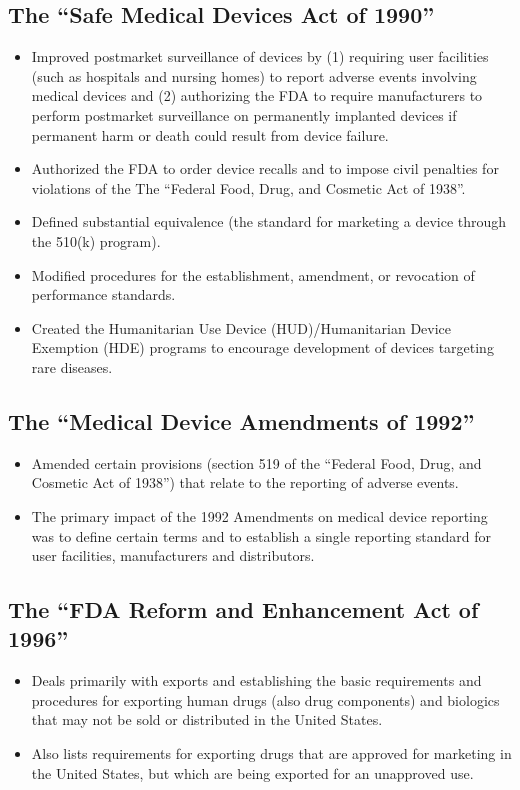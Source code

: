 \documentclass[11pt]{book}
\begin{document}
\subsection{The ``Safe Medical Devices Act of 1990''}
\begin{itemize}
	\item Improved postmarket surveillance of devices by (1) requiring user facilities (such as hospitals and nursing homes) to report adverse events involving medical devices and (2) authorizing the FDA to require manufacturers to perform postmarket surveillance on permanently implanted devices if permanent harm or death could result from device failure.
	\item Authorized the FDA to order device recalls and to impose civil penalties for violations of the The ``Federal Food, Drug, and Cosmetic Act of 1938''.
	\item Defined substantial equivalence (the standard for marketing a device through the 510(k) program).
	\item Modified procedures for the establishment, amendment, or revocation of performance standards.
	\item Created the Humanitarian Use Device (HUD)/Humanitarian Device Exemption (HDE) programs to encourage development of devices targeting rare diseases.
\end{itemize}

\subsection{The ``Medical Device Amendments of 1992''}
\begin{itemize}
	\item  Amended certain provisions (section 519 of the ``Federal Food, Drug, and Cosmetic Act of 1938'') that relate to the reporting of adverse events. 
	\item The primary impact of the 1992 Amendments on medical device reporting was to define certain terms and to establish a single reporting standard for user facilities, manufacturers and distributors.
\end{itemize}

\subsection{The ``FDA Reform and Enhancement Act of 1996''}
\begin{itemize}
	\item Deals primarily with exports and establishing the basic requirements and procedures for exporting human drugs (also drug components) and biologics that may not be sold or distributed in the United States. 
	\item Also lists requirements for exporting drugs that are approved for marketing in the United States, but which are being exported for an unapproved use. 
\end{itemize}
\end{document}
